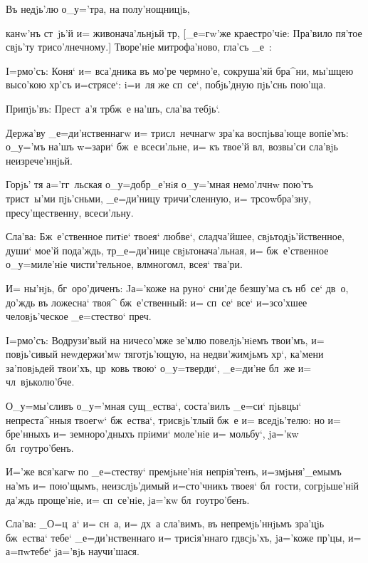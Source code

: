 Въ недjь'лю о_у='тра, на полу'нощницjь,

канw'нъ ст~jь'й и= живонача'льнjьй тр, [_е=гw'же 
краестро'чiе: Пра'вило пя'тое свjь'ту трисо'лнечному.] 
Творе'нiе митрофа'ново, гла'съ _е~:


I=рмо'съ: Коня` и= вса'дника въ мо'ре чермно'е, 
сокруша'яй бра^ни, мы'шцею высо'кою хр'съ и=стрясе`: 
i=и~ля же сп~се`, побjь'дную пjь'снь пою'ща.

Припjь'въ: Прест~а'я тр бж~е на'шъ, сла'ва тебjь`. 

Держа'ву _е=ди'нственнагw и= трисл~нечнагw зра'ка 
воспjьва'юще вопiе'мъ: о_у='мъ на'шъ w=зари` бж~е 
всеси'льне, и= къ твое'й вл, возвы'си сла'вjь 
неизрече'ннjьй.

Горjь' тя а='гг~льская о_у=добр_е'нiя о_у='мная 
немо'лчнw пою'тъ трист~ы'ми пjь'сньми, _е=ди'ницу 
тричи'сленную, и= тр соwбра'зну, пресу'щественну, 
всеси'льну.

Сла'ва: Бж~е'ственное питiе` твоея` любве`, 
сладча'йшее, свjьтодjь'йственное, души` мое'й пода'ждь, 
тр _е=ди'нице свjьтонача'льная, и= бж~е'ственное 
о_у=миле'нiе чисти'тельное, вл многомл, всея` 
тва'ри.

И= ны'нjь, бг~оро'диченъ: Jа='коже на руно` сни'де 
без\ъ шу'ма съ нб~се` дв~о, до'ждь въ ложесна` твоя^ 
бж~е'ственный: и= сп~се` все` и=зсо'хшее человjь'ческое 
_е=стество` преч.


I=рмо'съ: Водрузи'вый на ничесо'мже зе'млю 
повелjь'нiемъ твои'мъ, и= повjь'сивый неwдержи'мw 
тяготjь'ющую, на недви'жимjьмъ хр`, ка'мени 
за'повjьдей твои'хъ, цр~ковь твою` о_у=тверди`, _е=ди'не 
бл~же и= чл~вjьколю'бче.

О_у=мы'сливъ о_у='мная сущ_ества`, соста'вилъ _е=си` 
пjьвцы` непреста^нныя твоегw` бж~ества`, трисвjь'тлый 
бж~е и= вседjь'телю: но и= бре'нныхъ и= земноро'дныхъ 
прiими` моле'нiе и= мольбу`, jа='кw бл~гоутро'бенъ.

И='же вся'кагw по _е=стеству` премjьне'нiя 
непрiя'тенъ, и=змjьня'_емымъ на'мъ и= пою'щымъ, 
неизслjь'димый и=сто'чникъ твоея` бл~гости, согрjьше'нiй 
да'ждь проще'нiе, и= сп~се'нiе, jа='кw бл~гоутро'бенъ.

Сла'ва: _О=ц~а` и= сн~а, и= дх~а сла'вимъ, въ 
непремjь'ннjьмъ зра'цjь бж~ества` тебе` _е=ди'нственнаго 
и= трисiя'ннаго гд всjь'хъ, jа='коже пр'цы, и= 
а=п w\т тебе` jа='вjь научи'шася. 

